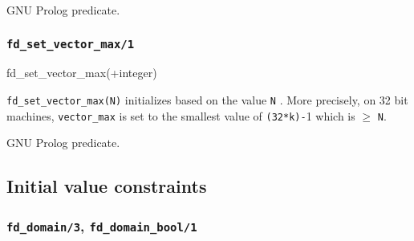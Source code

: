 \begin{PlErrors}


\end{PlErrors}

\Portability

GNU Prolog predicate.

\subsubsection{\texttt{fd\_set\_vector\_max/1}}
\label{fd-set-vector-max/1}

\begin{TemplatesOneCol}
fd\_set\_vector\_max(+integer)

\end{TemplatesOneCol}

\Description

\texttt{fd\_set\_vector\_max(N)} initializes  based on
the value \texttt{N} . More precisely, on 32 bit
machines, \texttt{vector\_max} is set to the smallest value of
\texttt{(32*k)-}1 which is $\geq$ \texttt{N}.

\begin{PlErrors}




\end{PlErrors}

\Portability

GNU Prolog predicate.

\subsection{Initial value constraints}

\subsubsection{\texttt{fd\_domain/3},
               \texttt{fd\_domain\_bool/1}}

